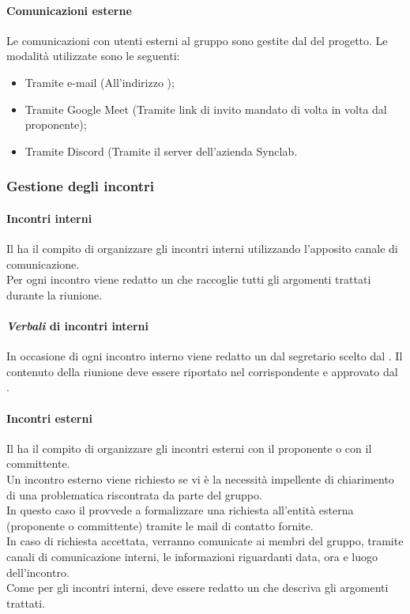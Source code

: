       \paragraph{Comunicazioni esterne}
      Le comunicazioni con utenti esterni al gruppo sono gestite dal \roleProjectManagerLow{} del progetto. Le modalità utilizzate sono le seguenti:
      \begin {itemize}
        \item Tramite e-mail (All'indirizzo \groupEmail{});
        \item Tramite Google Meet\glo{} (Tramite link di invito mandato di volta in volta dal proponente);
        \item Tramite Discord\glo{} (Tramite il server dell'azienda Synclab.
      \end {itemize}

    \subsubsection{Gestione degli incontri}
      \paragraph{Incontri interni}
        Il \roleProjectManagerLow{} ha il compito di organizzare gli incontri interni utilizzando l'apposito canale di comunicazione.\\
        Per ogni incontro viene redatto un \docNameVLow{} che raccoglie tutti gli argomenti trattati durante la riunione.
      \paragraph {\textit{Verbali} di incontri interni}
      In occasione di ogni incontro interno viene redatto un \docNameVLow{} dal segretario scelto dal \roleProjectManagerLow{}. Il contenuto della riunione deve essere riportato nel \docNameVLow{} corrispondente e approvato dal \roleProjectManagerLow{}.

      \paragraph{Incontri esterni}
        Il \roleProjectManagerLow{} ha il compito di organizzare gli incontri esterni con il proponente o con il committente.\\
        Un incontro esterno viene richiesto se vi è la necessità impellente di chiarimento di una problematica riscontrata da parte del gruppo.\\
        In questo caso il \roleProjectManagerLow{} provvede a formalizzare una richiesta all'entità esterna (proponente o committente) tramite le mail di contatto fornite.\\
        In caso di richiesta accettata, verranno comunicate ai membri del gruppo, tramite canali di comunicazione interni, le informazioni riguardanti data, ora e luogo dell'incontro.\\
        Come per gli incontri interni, deve essere redatto un \docNameVLow{} che descriva gli argomenti trattati.
